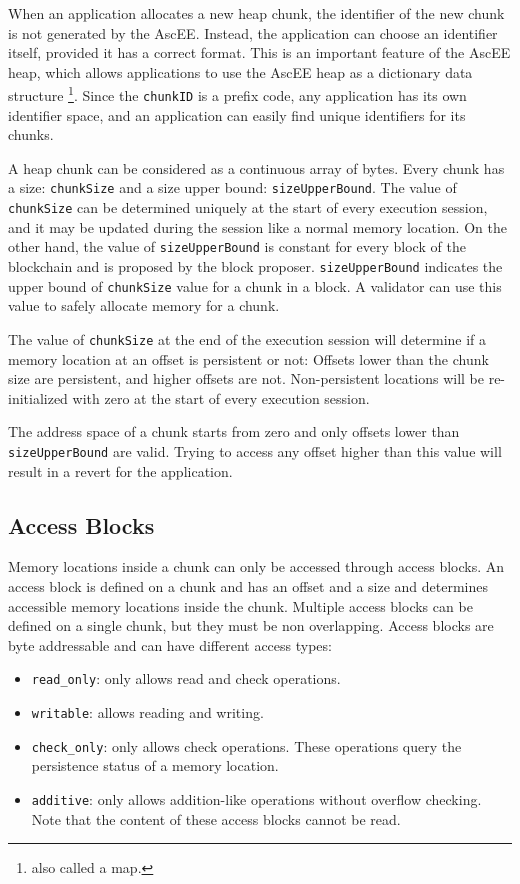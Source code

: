When an application allocates a new heap chunk, the identifier of the new chunk is not generated by
the AscEE. Instead, the application can choose an identifier itself, provided it has a correct format. This
is an important feature of the AscEE heap, which allows applications to use the AscEE heap as a dictionary
data structure \footnote{also called a map.}.
Since the \texttt{chunkID} is a prefix code, any application has its own identifier space, and an application
can easily find unique identifiers for its chunks.

A heap chunk can be considered as a continuous
array of bytes. Every chunk has a size: \texttt{chunkSize} and a size upper bound: \texttt{sizeUpperBound}. The value of
\texttt{chunkSize} can be determined uniquely at
the start of
every execution session, and it may be updated during the session like a normal memory location. On the other hand,
the value of \texttt{sizeUpperBound} is constant for every block of the blockchain and is proposed by the block
proposer. \texttt{sizeUpperBound} indicates the upper bound of \texttt{chunkSize} value for a chunk in a block.
A validator can use this value to safely allocate memory for a chunk.

The value of \texttt{chunkSize} at the end of the execution session will determine if a memory location at an
offset is persistent or not: Offsets lower than the chunk size are persistent, and higher offsets are not.
Non-persistent locations will be re-initialized with zero at the start of every execution session.

The address space of a chunk starts from zero and only offsets lower than \texttt{sizeUpperBound} are valid. Trying to
access any offset higher than this value will result in a revert for the application.

\subsection{Access Blocks}\label{subsec:access-blocks}

Memory locations inside a chunk can only be accessed through access blocks. An access block is defined on a chunk
and has an offset and a size and determines accessible memory locations inside the chunk. Multiple access blocks can
be defined on a single chunk, but they must be non overlapping. Access blocks are byte addressable and can have
different access types:

\begin{itemize}
    \item \texttt{read\_only}: only allows read and check operations.
    \item \texttt{writable}: allows reading and writing.
    \item \texttt{check\_only}: only allows check operations. These operations query the persistence
    status of a memory location.
    \item \texttt{additive}: only allows addition-like operations without overflow checking. Note that the content of
    these access blocks cannot be read.
\end{itemize}

